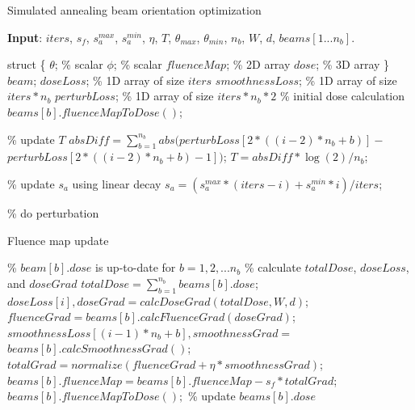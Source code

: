 \documentclass[letterpaper,11pt]{article}
\begin{document}
 

\begin{algorithm}
	\caption{Simulated annealing beam orientation optimization} 
	\begin{algorithmic}[1]
		\State \textbf{Input}: $iters$, $s_f$, $s_a^{max}$, 
		$s_a^{min}$, $\eta$, $T$, $\theta_{max}$, $\theta_{min}$, $n_b$, 
		$W$, $d$, $beams[1...n_b]$.

		\State struct
		\State \{
			\State \phantom{for} $\theta$; \% scalar
			\State \phantom{for} $\phi$; \% scalar
			\State \phantom{for} $fluenceMap$; \% 2D array
			\State \phantom{for} $dose$; \% 3D array
		\State \} $beam$;
		\State
		\State $doseLoss$; \% 1D array of size $iters$
		\State $smoothnessLoss$; \% 1D array of size $iters*n_b$
		\State $perturbLoss$; \% 1D array of size $iters*n_b*2$
		\State
		\State \% initial dose calculation
			\State $beams[b].fluenceMapToDose()$;
		\EndFor
		\State

			\State {}
			\State
			\State \% update $T$
				\State $absDiff=\sum_{b=1}^{n_b}abs(perturbLoss[2*((i-2)*n_b+b)]-$
				\State \phantom{for} $perturbLoss[2*((i-2)*n_b+b)-1])$;
				\State $T = absDiff*\log(2)/n_b$;
			\EndIf

			\State
			\State \% update $s_a$ using linear decay
			\State $s_a=(s_a^{max}*(iters-i)+s_a^{min}*i)/iters$;

			\State
			\State \% do perturbation
			\State {}
		\EndFor
	\end{algorithmic} 
\end{algorithm}

\begin{algorithm}
	\caption{Fluence map update} 
	\begin{algorithmic}[1]
            \State \% $beam[b].dose$ is up-to-date for $b=1,2,...n_b$
            \State \% calculate $totalDose$, $doseLoss$, and $doseGrad$
            \State $totalDose=\sum_{b=1}^{n_b}beams[b].dose$;
            \State $doseLoss[i], doseGrad=calcDoseGrad(totalDose, W, d)$;
                \State $fluenceGrad=beams[b].calcFluenceGrad(doseGrad)$;
                \State $smoothnessLoss[(i-1)*n_b+b], smoothnessGrad = $\
                \State \phantom{for} $beams[b].calcSmoothnessGrad()$;
                \State $totalGrad=normalize(fluenceGrad+\eta*smoothnessGrad)$;
                \State $beams[b].fluenceMap = beams[b].fluenceMap -s_f * totalGrad$;
                \State $beams[b].fluenceMapToDose();$ \% update $beams[b].dose$
            \EndFor
        \EndProcedure
	\end{algorithmic} 
\end{algorithm}
\end{document}
